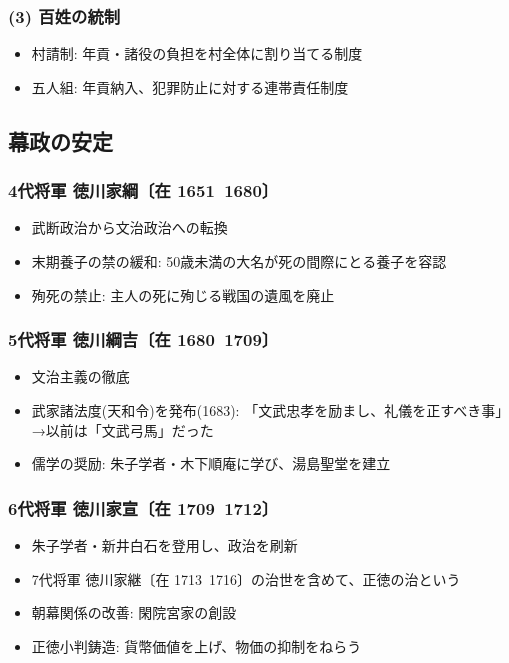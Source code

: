 \documentclass[a4paper,11pt]{jsarticle}
\begin{document}
\subsubsection*{(3) 百姓の統制}
\begin{itemize}
  \item 村請制: 年貢・諸役の負担を村全体に割り当てる制度
  \item 五人組: 年貢納入、犯罪防止に対する連帯責任制度
\end{itemize}

\subsection*{幕政の安定}
\subsubsection*{4代将軍 徳川家綱〔在 1651~1680〕}
\begin{itemize}
  \item 武断政治から文治政治への転換
  \item 末期養子の禁の緩和: 50歳未満の大名が死の間際にとる養子を容認
  \item 殉死の禁止: 主人の死に殉じる戦国の遺風を廃止
\end{itemize}

\subsubsection*{5代将軍 徳川綱吉〔在 1680~1709〕}
\begin{itemize}
  \item 文治主義の徹底
  \item 武家諸法度(天和令)を発布(1683): 「文武忠孝を励まし、礼儀を正すべき事」→以前は「文武弓馬」だった
  \item 儒学の奨励: 朱子学者・木下順庵に学び、湯島聖堂を建立
\end{itemize}

\subsubsection*{6代将軍 徳川家宣〔在 1709~1712〕}
\begin{itemize}
  \item 朱子学者・新井白石を登用し、政治を刷新
  \item 7代将軍 徳川家継〔在 1713~1716〕の治世を含めて、正徳の治という
  \item 朝幕関係の改善: 閑院宮家の創設
  \item 正徳小判鋳造: 貨幣価値を上げ、物価の抑制をねらう
\end{itemize}
\end{document}
